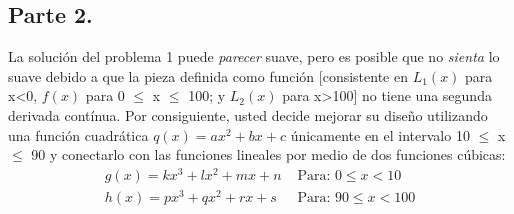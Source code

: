 \documentclass[11pt,letterpaper]{article}
\begin{document}
\subsection{Parte 2.}
La solución del problema 1 puede \textit{parecer} suave, pero es posible que no \textit{sienta} lo suave debido a que la pieza definida como función [consistente en $L_1(x)$ para x<0, $f(x)$ para 0 $\leq$ x $\leq$ 100; y $L_2(x)$ para x>100] no tiene una segunda derivada contínua. Por consiguiente, usted decide mejorar su diseño utilizando una función cuadrática $q(x)=ax^2+bx+c$ únicamente en el intervalo 10 $\leq$ x $\leq$ 90 y conectarlo con las funciones lineales por medio de dos funciones cúbicas:
\begin{equation*}
  \begin{split}
    g(x)=kx^3+lx^2+mx+n  &\text{  Para: } 0 \leq x < 10 \\
    h(x)=px^3+qx^2+rx+s  &\text{  Para: } 90 \leq x < 100
  \end{split}
\end{equation*}
\end{document}
